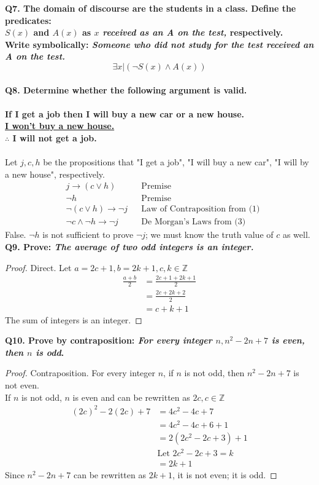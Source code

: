 \documentclass[letterpaper,12pt]{article}
\begin{document}
\textbf{Q7. The domain of discourse are the students in a class. Define the predicates: \\ $S(x)$ and $A(x)$ as \textit{$x$ received as an A on the test,} respectively. \\ 
Write symbolically: \textit{Someone who did not study for the test received an A on the test.}} \\
$$\exists x | (\neg S(x) \land A(x))$$ \\
\textbf{Q8. Determine whether the following argument is valid. \\
\\
If I get a job then I will buy a new car or a new house. \\
\underline{I won't buy a new house.} \\
$\therefore$ I will not get a job.} \\
\\
Let $j,c,h$ be the propositions that "I get a job", "I will buy a new car", "I will by a new house", respectively.
\begin{align}
    &j \rightarrow (c \lor h)               &&\text{Premise} \\
    &\neg h                                 &&\text{Premise} \\
    &\neg (c \lor h) \rightarrow \neg j     &&\text{Law of Contraposition from (1)} \\
    &\neg c \land \neg h \rightarrow \neg j &&\text{De Morgan's Laws from (3)}
\end{align}
False. $\neg h$ is not sufficient to prove $\neg j$; we must know the truth value of $c$ as well. \\
\newpage
\textbf{Q9. Prove: \textit{The average of two odd integers is an integer.}}
\begin{proof} Direct. Let $a = 2c+1, b=2k+1, c,k \in \mathbb{Z}$
\begin{align*}
\frac{a+b}{2} &= \frac{2c+1 + 2k+1}{2} \\
              &= \frac{2c + 2k + 2}{2} \\
              &= c + k + 1 
\end{align*}
The sum of integers is an integer.
\end{proof}
\textbf{Q10. Prove by contraposition: \textit{For every integer $n, n^2 - 2n + 7$ is even, then $n$ is odd}.}
\begin{proof} Contraposition. For every integer $n$, if $n$ is not odd, then $n^2 - 2n + 7$ is not even. \\
If $n$ is not odd, $n$ is even and can be rewritten as $2c, c \in \mathbb{Z}$
\begin{align*}
    (2c)^2 - 2(2c) + 7 &= 4c^2 - 4c + 7 \\
                       &= 4c^2 - 4c + 6 + 1 \\
                       &= 2(2c^2 - 2c + 3) + 1 \\
                       &\text{Let } 2c^2 - 2c + 3 = k \\
                       &= 2k + 1 
\end{align*}
Since $n^2 - 2n + 7$ can be rewritten as $2k + 1$, it is not even; it is odd.
\end{proof}
\end{document}
